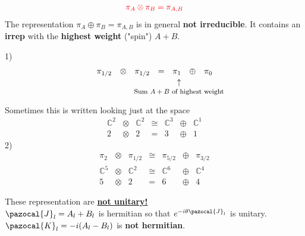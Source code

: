 \documentclass[../main.tex]{subfiles}
\begin{document}
\[
{\color{red}\pi_A\otimes\pi_B=\pi_{A,B}}
\]
{\selectfont{}\relax}
The representation $\pi_A\oplus\pi_B=\pi_{A,B}$ is in general \textbf{not irreducible}. It contains an \textbf{irrep} with the \textbf{highest weight} ("spin") {\color{red}$A+B$}.
\begin{example}1)
\[
\begin{array}{ccccccc}
    \pi_{1/2} & \otimes & \pi_{1/2} & = & \pi_{\underset{\mathclap{\tikz \node {$\uparrow$} node [below=1ex] {\footnotesize Sum $A+B$ of highest weight};}}{1}} & \oplus & \pi_0 \\
\end{array}
\]
Sometimes this is written looking just at the space
\[
\begin{array}{ccccccc}
    \mathbb{C}^2 & \otimes & \mathbb{C}^2 & \cong & \mathbb{C}^3 & \oplus & \mathbb{C}^1 \\ 
    2 & \otimes & 2 & = & 3 & \oplus & 1
\end{array}
\]
2)
\[
\begin{array}{ccccccc}
    \pi_2 & \otimes & \pi_{1/2} & \cong & \pi_{5/2} & \oplus & \pi_{3/2} \\
    \mathbb{C}^5 & \otimes & \mathbb{C}^2 & \cong & \mathbb{C}^6 & \oplus & \mathbb{C}^4 \\ 
    5 & \otimes & 2 & = & 6 & \oplus & 4
\end{array}
\]
\end{example}
{\selectfont{}\relax}
These representation are \underline{\textbf{not unitary!}}\\ $\pazocal{J}_l=A_l+B_l$ is hermitian so that $e^{-i\theta\pazocal{J}_l}$ is unitary. \\
$\pazocal{K}_l=-i(A_l-B_l)$ is \textbf{not hermitian}. \\
\end{document}
